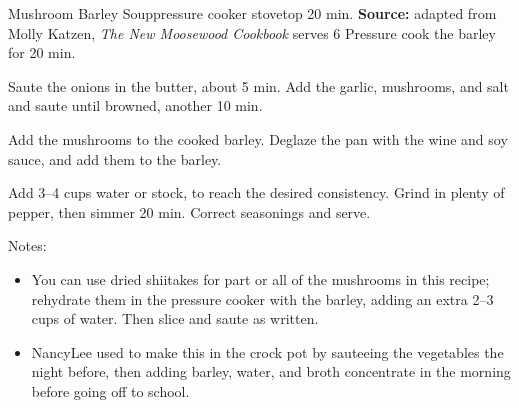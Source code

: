 \begin{recipe}{Mushroom Barley Soup}{pressure cooker \hfill stovetop \hfill 20 min.}
 {\textbf{Source:} adapted from Molly Katzen, \textit{The New Moosewood Cookbook} \hfill serves 6}
 Pressure cook the barley for 20 min.

 Saute the onions in the butter, about 5 min. Add the garlic, mushrooms, and salt and saute until browned, another 10 min.

 Add the mushrooms to the cooked barley. Deglaze the pan with the wine and soy sauce, and add them to the barley.

 Add 3--4 cups water or stock, to reach the desired consistency. Grind in plenty of pepper, then simmer 20 min. Correct seasonings and serve.

 \freeform Notes:
 \begin{itemize}
  \item You can use dried shiitakes for part or all of the mushrooms in this recipe; rehydrate them in the pressure cooker with the barley, adding an extra 2--3 cups of water. Then slice and saute as written.
  \item NancyLee used to make this in the crock pot by sauteeing the vegetables the night before, then adding barley, water, and broth concentrate in the morning before going off to school.
 \end{itemize}
\end{recipe}
